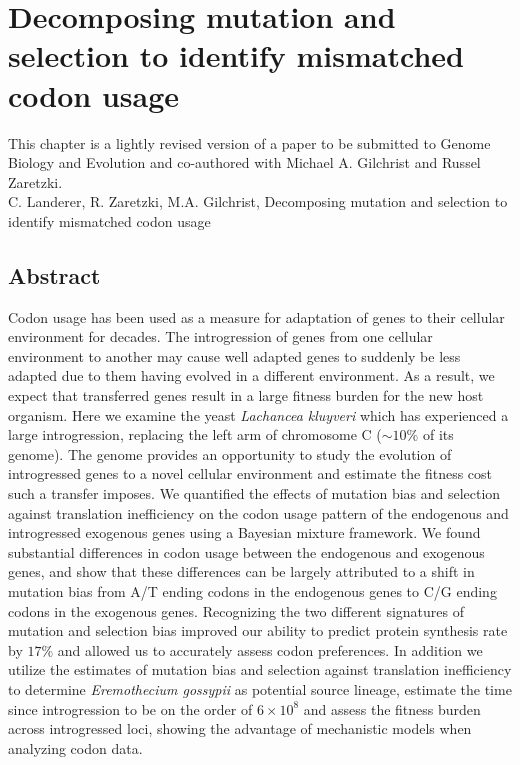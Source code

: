 \chapter{Decomposing mutation and selection to identify mismatched codon usage}
\label{ch:kluyveri}

\clearpage
\pagebreak

This chapter is a lightly revised version of a paper to be submitted to Genome Biology and Evolution and co-authored with Michael A. Gilchrist and Russel Zaretzki.\\
\newline
\newline
C. Landerer, R. Zaretzki, M.A. Gilchrist, Decomposing mutation and selection to identify mismatched codon usage

\section{Abstract}
Codon usage has been used as a measure for adaptation of genes to their cellular environment for decades. 
The introgression of genes from one cellular environment to another may cause well adapted genes to suddenly be less adapted due to them having evolved in a different environment.
As a result, we expect that transferred genes result in a large fitness burden for the new host organism.
Here we examine the yeast \textit{Lachancea kluyveri} which has experienced a large introgression, replacing the left arm of chromosome C ($\sim 10 \%$ of its genome).
The \kluyveri genome provides an opportunity to study the evolution of introgressed genes to a novel cellular environment and estimate the fitness cost such a transfer imposes.
We quantified the effects of mutation bias and selection against translation inefficiency on the codon usage pattern of the endogenous and introgressed exogenous genes using a Bayesian mixture framework.
We found substantial differences in codon usage between the endogenous and exogenous genes, and show that these differences can be largely attributed to a shift in mutation bias from A/T ending codons in the endogenous genes to C/G ending codons in the exogenous genes.
Recognizing the two different signatures of mutation and selection bias improved our ability to predict protein synthesis rate by $17 \%$ and allowed us to accurately assess codon preferences.
In addition we utilize the estimates of mutation bias and selection against translation inefficiency to determine \textit{Eremothecium gossypii} as potential source lineage, estimate the time since introgression to be on the order of $6\times 10^8$ and assess the fitness burden across introgressed loci, showing the advantage of mechanistic models when analyzing codon data.

